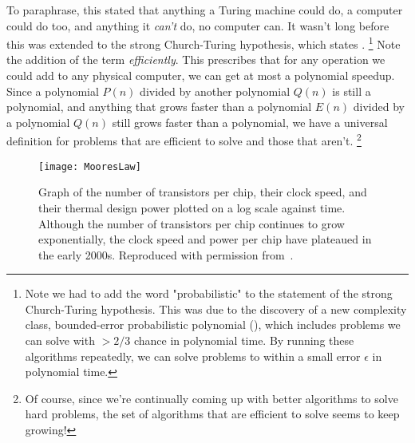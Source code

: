 To paraphrase, this stated that anything a Turing machine could do, a computer could do too, and anything
it \emph{can't} do, no computer can. It wasn't long before this was extended to the strong Church-Turing
hypothesis, which states .
\footnote{Note we had to add the word "probabilistic" to the statement of the strong Church-Turing hypothesis. This was
 due to the discovery of a new complexity class, bounded-error probabilistic polynomial (), which includes problems
 we can solve with $> 2/3$ chance in polynomial time. By running these algorithms repeatedly, we can solve problems to within
 a small error $\epsilon$ in polynomial time.}
Note the addition of the term \emph{efficiently}. This prescribes that for any
operation we could add to any physical computer, we can get at most a polynomial speedup. Since
a polynomial $P(n)$ divided by another polynomial $Q(n)$ is still a polynomial, and anything that grows faster
than a polynomial $E(n)$ divided by a polynomial $Q(n)$ still grows faster than a polynomial, we have
a universal definition for problems that are efficient to solve and those that aren't.
\footnote{Of course, since we're continually coming up with better algorithms to solve hard problems,
the set of algorithms that are efficient to solve seems to keep growing!}


\begin{figure}
  \texttt{[image: MooresLaw]}
  \caption[Moore's Law and the end of exponential scaling]
  {Graph of the number of transistors per chip, their clock speed, and their
  thermal design power plotted on a log scale against time. Although the number of transistors per chip
  continues to grow exponentially, the clock speed and power per chip have plateaued in the early 2000s.
  Reproduced with permission from~\cite{cross_2016}.}
  \label{fig:mooreslaw}
\end{figure}

